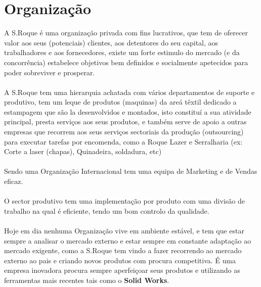 {\section{Organização}
\qquad A S.Roque é uma organização privada com fins lucrativos, que tem de oferecer valor aos seus (potenciais) clientes, aos detentores do seu capital, aos trabalhadores e aos fornecedores, existe um forte estimulo do mercado (e da concorrência) estabelece objetivos bem definidos e socialmente apetecidos para poder sobreviver e prosperar.\\
\\
A S.Roque tem uma hierarquia achatada com vários departamentos de suporte e produtivo, tem um leque de produtos (maquinas) da areá têxtil dedicado a estampagem que são la desenvolvidos e montados, isto constituí a sua atividade principal, presta serviços aos seus produtos, e também serve de apoio a outras empresas que recorrem aos seus serviços sectoriais da produção (outsourcing) para executar tarefas por encomenda, como a Roque Lazer e Serralharia (ex: Corte a laser (chapas), Quinadeira, soldadura, etc)\\
\\
Sendo uma Organização Internacional tem uma equipa de Marketing e de Vendas eficaz.\\
\\
O sector produtivo tem uma implementação por produto com uma divisão de trabalho na qual é eficiente, tendo um bom controlo da qualidade.\\
\\
Hoje em dia nenhuma Organização vive em ambiente estável, e tem que estar sempre a analisar o mercado externo e estar sempre em constante adaptação ao mercado exigente, como a S.Roque tem vindo a fazer recorrendo ao mercado externo ao pais e criando novos produtos com procura competitiva. É uma empresa inovadora procura sempre aperfeiçoar seus produtos e utilizando as ferramentas mais recentes tais como o \textbf{Solid Works}.\\


}
